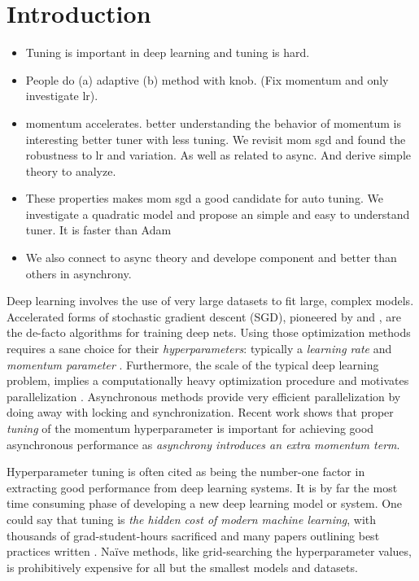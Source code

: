 \section{Introduction}

\begin{itemize}
\item Tuning is important in deep learning and tuning is hard.
\item People do (a) adaptive (b) method with knob. (Fix momentum and only investigate lr).
\item momentum accelerates. better understanding the behavior of momentum is interesting better tuner with less tuning. We revisit mom sgd and found the robustness to lr and variation. As well as related to async. And derive simple theory to analyze. 
\item These properties makes mom sgd a good candidate for auto tuning. We investigate a quadratic model and propose an simple and easy to understand tuner. It is faster than Adam
\item We also connect to async theory and develope component and better than others in asynchrony.  
\end{itemize}

\outline{[PROBLEM]}
Deep learning involves the use of very large datasets to fit large, complex models.
Accelerated forms of stochastic gradient descent (SGD), pioneered by
\cite{polyak1964some} and \cite{nesterov1983method}, are the de-facto
algorithms for training deep nets.
Using those optimization methods requires a sane choice for their {\em hyperparameters}: 
typically a {\em learning rate} and {\em momentum parameter} \citep{sutskever2013importance}.
Furthermore, the scale of the typical deep learning problem, implies a computationally heavy optimization procedure and motivates parallelization \cite{dean2012large,chilimbi2014project,hadjis2016omnivore,chen2016revisiting}.
Asynchronous methods \cite{recht2011hogwild} provide very efficient parallelization by doing away with locking and synchronization. 
Recent work \cite{mitliagkas2016asynchrony,hadjis2016omnivore} shows that proper {\em tuning} of the momentum hyperparameter is important for achieving good asynchronous performance as {\em asynchrony introduces an extra momentum term}.

Hyperparameter tuning is often cited as being the number-one factor in extracting good performance from deep learning systems. 
It is by far the most time consuming phase of developing a new deep learning model or system.
One could say that tuning is {\em the hidden cost of modern machine learning},
with thousands of grad-student-hours sacrificed and many papers outlining best practices written
\cite{bengio2012practical}.
Na\"ive methods, like grid-searching the hyperparameter values,
is prohibitively expensive for all but the smallest models and datasets.


